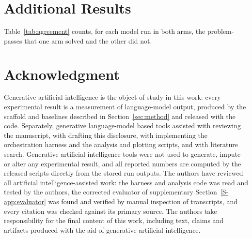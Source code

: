 \documentclass[journal]{IEEEtran}
\begin{document}
\section{Additional Results}
\label{app:results}


Table~\ref{tab:agreement} counts, for each model run in both arms, the problem-passes that one
arm solved and the other did not.








\section*{Acknowledgment}

Generative artificial intelligence is the object of study in this work: every experimental
result is a measurement of language-model output, produced by the scaffold and baselines
described in Section~\ref{sec:method} and released with the code. Separately, generative
language-model based tools assisted with reviewing the manuscript, with drafting this
disclosure, with implementing the orchestration harness and the analysis and plotting scripts,
and with literature search. Generative artificial intelligence tools were not used to generate,
impute or alter any experimental result, and all reported numbers are computed by the released
scripts directly from the stored run outputs. The authors have reviewed all artificial
intelligence-assisted work: the harness and analysis code was read and tested by the authors,
the corrected evaluator of supplementary Section~\ref{S-app:evaluator} was found and verified by manual
inspection of transcripts, and every citation was checked against its primary source. The
authors take responsibility for the final content of this work, including text, claims and
artifacts produced with the aid of generative artificial intelligence.



\end{document}
